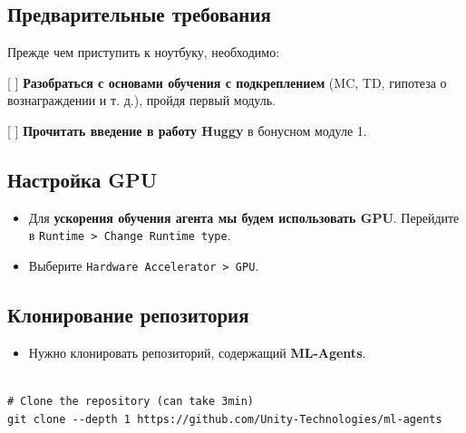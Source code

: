\documentclass[11pt,a4paper]{article}
\begin{document}
\subsection{Предварительные требования}\label{prerequisites}

Прежде чем приступить к ноутбуку, необходимо:

{[} {]} \textbf{Разобраться с основами обучения с подкреплением} (MC, TD, гипотеза о вознаграждении и т. д.), пройдя первый модуль.

{[} {]} \textbf{Прочитать введение в работу Huggy} в бонусном модуле 1.

\subsection{Настройка GPU}\label{set-the-gpu}

\begin{itemize}
\tightlist
\item
  Для \textbf{ускорения обучения агента мы будем использовать GPU}. Перейдите в \texttt{Runtime\ \textgreater{}\ Change\ Runtime\ type}.
\end{itemize}


\begin{itemize}
\tightlist
\item
  Выберите \texttt{Hardware\ Accelerator\ \textgreater{}\ GPU}.
\end{itemize}


\subsection{Клонирование репозитория}\label{clone-the-repository}

\begin{itemize}
\tightlist
\item
  Нужно клонировать репозиторий, содержащий \textbf{ML-Agents}.
\end{itemize}

\begin{lstlisting}

# Clone the repository (can take 3min)
git clone --depth 1 https://github.com/Unity-Technologies/ml-agents
\end{lstlisting}
\end{document}
